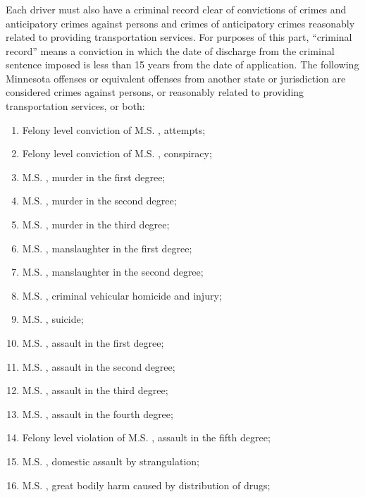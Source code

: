 \subsubsection{}
Each driver must also have a criminal record clear of convictions of crimes and anticipatory crimes against persons and crimes of anticipatory crimes reasonably related to providing transportation services.  For purposes of this part, “criminal record” means a conviction in which the date of discharge from the criminal sentence imposed is less than 15 years from the date of application.  The following Minnesota offenses or equivalent offenses from another state or jurisdiction are considered crimes against persons, or reasonably related to providing transportation services, or both:
\begin{enumerate}[{\indent}1)]
    \item Felony level conviction of M.S. , attempts;
    \item Felony level conviction of M.S. , conspiracy;
    \item M.S. , murder in the first degree;
    \item M.S. , murder in the second degree;
    \item M.S. , murder in the third degree;
    \item M.S. , manslaughter in the first degree;
    \item M.S. , manslaughter in the second degree;
    \item M.S. , criminal vehicular homicide and injury;
    \item M.S. , suicide;
    \item M.S. , assault in the first degree;
    \item M.S. , assault in the second degree;
    \item M.S. , assault in the third degree;
    \item M.S. , assault in the fourth degree;
    \item Felony level violation of M.S. , assault in the fifth degree;
    \item M.S. , domestic assault by strangulation;
    \item M.S. , great bodily harm caused by distribution of drugs;

\end{enumerate}
